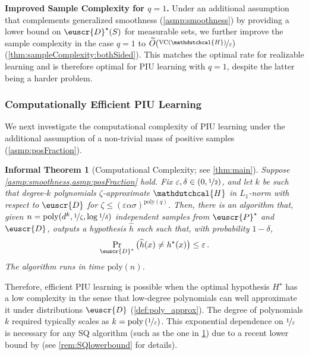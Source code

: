 \documentclass[11pt]{article}
\theoremstyle{plain}
\newtheorem{inftheorem}[theorem]{Informal Theorem}
\theoremstyle{definition}
\theoremstyle{remark}
\newcommand{\sinparen}[1]{(#1)}
\newcommand{\binparen}[1]{\big(#1\big)}
\newcommand{\inparen}[1]{\left(#1\right)}
\newcommand{\nfrac}[2]{\nicefrac{#1}{#2}}
\newcommand{\poly}{\mathrm{poly}}
\newcommand{\vc}{\textrm{\rm VC}}
\newcommand{\eps}{\varepsilon}
\newcommand{\wh}[1]{\widehat{#1}}
\newcommand{\wt}[1]{\widetilde{#1}}
\newcommand{\customcal}[1]{\euscr{#1}}
\newcommand{\cD}{\customcal{D}}
\newcommand{\cP}{\customcal{P}}
\newcommand{\hypo}[1]{\mathdutchcal{#1}}
\newcommand{\hyH}{\hypo{H}}
\newcommand{\optset}{{H^\star}}
\newcommand{\cDtrue}{\cD^\star}
\newcommand{\cDgiven}{\cD}
\newcommand{\cPtrue}{\cP^\star}
\newcommand{\nL}{L}
\begin{document}
\noindent \textbf{Improved Sample Complexity for $q = 1$.} Under an additional assumption that complements generalized smoothness (\cref{asmp:smoothness}) by providing a lower bound on $\cDtrue(S)$ for measurable sets, we further improve the sample complexity in the case $q = 1$ to $\wt{O}\sinparen{\nfrac{\vc{}(\hyH)}{\eps}}$ (\cref{thm:sampleComplexity:bothSided}). This matches the optimal rate for realizable learning and is therefore optimal for PIU learning with $q = 1$, despite the latter being a harder problem. 

\subsubsection{Computationally Efficient PIU Learning} \label{sec:intro:computationallyEfficientResult}

We next investigate the computational complexity of PIU learning under the additional assumption of a non-trivial mass of positive samples (\cref{asmp:posFraction}).

\begin{inftheorem}[Computational Complexity; see \cref{thm:main}]\label{mainthm:algo}\label{infthm:main}
    Suppose \cref{asmp:smoothness,asmp:posFraction} hold. 
    Fix $\eps,\delta\in (0,\nfrac{1}{2})$, and let $k$ be such that degree-$k$ polynomials $\zeta$-approximate $\hyH$ in \mbox{$\nL_1$-norm} with respect to $\cDgiven$ for $\zeta\leq \inparen{{\eps\alpha}{\sigma}}^{\poly(q)}$.
    Then, there is an algorithm that, given $n=\poly(d^k,\nfrac{1}{\zeta},\log{\nfrac{1}{\delta}})$ independent samples from $\cPtrue$ and $\cDgiven$, outputs a hypothesis $\wh{h}$ such such that, with probability $1-\delta$, 
    \[
        \Pr_{\cDtrue}\binparen{\wh{h}(x)\neq h^\star(x)}\leq \eps\,.
    \]
    The algorithm runs in time $\poly(n)$.
\end{inftheorem}
        Therefore, efficient PIU learning is possible when the optimal hypothesis $\optset$ has a low complexity in the sense that low-degree polynomials can well approximate it under distributions $\cDgiven$ (\cref{def:poly_approx}). 
        The degree of polynomials $k$ required typically scales as $k = \poly\inparen{\nfrac{1}{\eps}}$. 
        This exponential dependence on $\nfrac{1}{\eps}$ is necessary for any SQ algorithm (such as the one in \cref{mainthm:algo}) due to a recent lower bound by \citet*{diakonikolas2024statistical} (see \cref{rem:SQlowerbound} for details).
\end{document}
